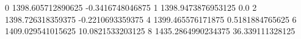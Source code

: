0 1398.605712890625 -0.3416748046875
1 1398.9473876953125 0.0
2 1398.726318359375 -0.2210693359375
4 1399.465576171875 0.5181884765625
6 1409.029541015625 10.0821533203125
8 1435.2864990234375 36.339111328125
